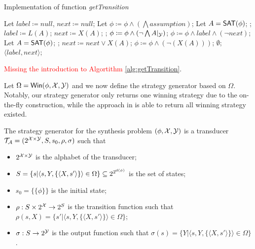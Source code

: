 \begin{algorithm}
\caption{Implementation of function \emph{getTransition}}\label{alg:getTransition}
	\begin{algorithmic}[1]
	
	\STATE Let $label\coloneqq null$, $next \coloneqq null$;
	\STATE Let $\phi\coloneqq \phi\wedge\left(\bigwedge assumption\right)$;
    	\STATE Let $A = \textsf{SAT} (\phi)$;
    		\BREAK;
    	\ENDIF
        	\STATE $label\coloneqq L(A)$;
        	\STATE $next\coloneqq X(A)$;
        	\BREAK;
    	\ENDIF
    	\STATE $\phi\coloneqq \phi\wedge\left(\neg\bigwedge A|_{\mathcal{Y}}\right)$;
	\ENDWHILE
	\STATE $\phi\coloneqq \phi\wedge label\wedge(\neg next)$;
    	\STATE Let $A = \textsf{SAT}(\phi)$;
    		\BREAK;
    	\ENDIF
    	\STATE $next\coloneqq next\vee X(A)$;
    	\STATE $\phi\coloneqq \phi\wedge(\neg (X(A)))$;
	\ENDWHILE
		\RETURN $\emptyset$;
	\ENDIF
	\RETURN $\langle label,next\rangle$;
	\end{algorithmic}
\end{algorithm}

\textcolor{red}{Missing the introduction to Algortithm \ref{alg:getTransition}}.

Let $\Omega = {\sf Win} (\phi, \mathcal{X}, \mathcal{Y})$ and we now define the strategy generator based on $\Omega$. Notably, our strategy generator only returns one winning strategy due to the on-the-fly construction, while the approach in \cite{GV15} is able to return all winning strategy existed. 

\begin{definition}\label{def:transducer}
	The strategy generator for the \ltlf synthesis problem $(\phi, \mathcal{X}, \mathcal{Y})$ is a transducer $\mathcal{T}_{\mathcal{A}}=(2^{\mathcal{X}\times\mathcal{Y}}, S, s_0, \rho, \sigma)$ such that
	\begin{itemize}
		\item $2^{\mathcal{X}\times\mathcal{Y}}$ is the alphabet of the transducer;
		\item $S = \{s| \langle s, Y, \{\langle X, s'\rangle\}\rangle \in\Omega\}\subseteq 2^{2^{{\sf cl}(\phi)}}$ is the set of states;
		\item $s_0 = \{\{\phi\}\}$ is the initial state;
		\item $\rho: S\times 2^{\mathcal{X}}\rightarrow 2^S$ is the transition function such that $\rho (s, X) = \{s' | \langle s, Y, \{\langle X, s'\rangle\}\rangle\in \Omega\}$;
		\item $\sigma: S\rightarrow 2^{\mathcal{Y}}$ is the output function such that $\sigma(s)=\{Y | \langle s, Y, \{\langle X, s'\rangle\}\rangle \in \Omega\}$.
	\end{itemize}
\end{definition}


